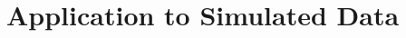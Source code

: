 \documentclass[fleqn,usenatbib]{mnras}
\begin{document}
%
%

%
%
%


\section{Application to Simulated Data}
\label{sec:sims}
\end{document}
